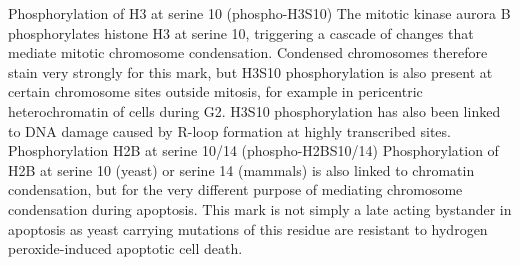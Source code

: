 Phosphorylation of H3 at serine 10 (phospho-H3S10)
The mitotic kinase aurora B phosphorylates histone H3 at serine 10, triggering a cascade of changes that mediate mitotic chromosome condensation. Condensed chromosomes therefore stain very strongly for this mark, but H3S10 phosphorylation is also present at certain chromosome sites outside mitosis, for example in pericentric heterochromatin of cells during G2. H3S10 phosphorylation has also been linked to DNA damage caused by R-loop formation at highly transcribed sites.
Phosphorylation H2B at serine 10/14 (phospho-H2BS10/14)
Phosphorylation of H2B at serine 10 (yeast) or serine 14 (mammals) is also linked to chromatin condensation, but for the very different purpose of mediating chromosome condensation during apoptosis. This mark is not simply a late acting bystander in apoptosis as yeast carrying mutations of this residue are resistant to hydrogen peroxide-induced apoptotic cell death.


